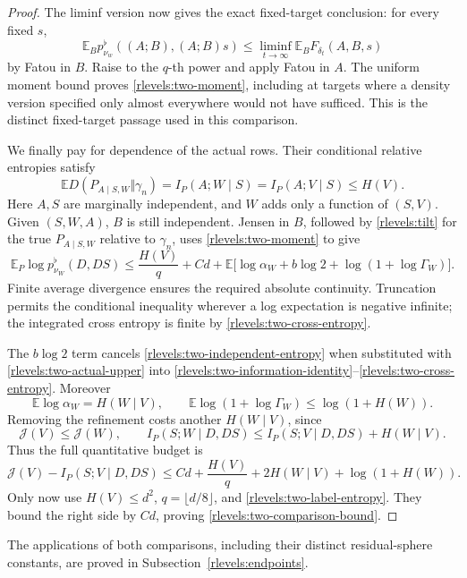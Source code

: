 \begin{proof}
The liminf version now gives the exact fixed-target conclusion:
for every fixed \(s\),
\[
 \mathbb E_Bp^\flat_{\nu_w}((A;B),(A;B)s)
 \le\liminf_{t\to\infty}\mathbb E_BF_{\delta_t}(A,B,s)
\]
by Fatou in \(B\).  Raise to the \(q\)-th power and apply Fatou
in \(A\).  The uniform moment bound proves
\eqref{rlevels:two-moment}, including at targets where a density
version specified only almost everywhere would not have sufficed.
This is the distinct fixed-target passage used in this comparison.

We finally pay for dependence of the actual rows.  Their conditional
relative entropies satisfy
\begin{equation}\label{rlevels:two-row-kl}
 \mathbb E D(P_{A\mid S,W}\Vert\gamma_n)
 =I_P(A;W\mid S)=I_P(A;V\mid S)\le H(V).
\end{equation}
Here \(A,S\) are marginally independent, and \(W\) adds only
a function of \((S,V)\).  Given \((S,W,A)\), \(B\) is still
independent.  Jensen in \(B\), followed by
\eqref{rlevels:tilt} for the true \(P_{A\mid S,W}\) relative to
\(\gamma_n\), uses \eqref{rlevels:two-moment} to give
\begin{equation}\label{rlevels:two-actual-upper}
 \mathbb E_P\log p^\flat_{\nu_W}(D,DS)
 \le \frac{H(V)}q+Cd+
 \mathbb E\bigl[\log\alpha_W+b\log2+
                    \log(1+\log\Gamma_W)\bigr].
\end{equation}
Finite average divergence ensures the required absolute continuity.
Truncation permits the conditional inequality wherever a log
expectation is negative infinite; the integrated cross entropy is
finite by \eqref{rlevels:two-cross-entropy}.

The \(b\log2\) term cancels
\eqref{rlevels:two-independent-entropy} when substituted with
\eqref{rlevels:two-actual-upper} into
\eqref{rlevels:two-information-identity}--\eqref{rlevels:two-cross-entropy}.
Moreover
\[
 \mathbb E\log\alpha_W=H(W\mid V),\qquad
 \mathbb E\log(1+\log\Gamma_W)\le\log(1+H(W)).
\]
Removing the refinement costs another \(H(W\mid V)\), since
\[
 \mathcal J(V)\le\mathcal J(W),\qquad
 I_P(S;W\mid D,DS)\le I_P(S;V\mid D,DS)+H(W\mid V).
\]
Thus the full quantitative budget is
\begin{equation}\label{rlevels:two-budget}
 \mathcal J(V)-I_P(S;V\mid D,DS)
 \le Cd+\frac{H(V)}q+2H(W\mid V)+\log(1+H(W)).
\end{equation}
Only now use \(H(V)\le d^2\), \(q=\lfloor d/8\rfloor\), and
\eqref{rlevels:two-label-entropy}.  They bound the right side by
\(Cd\), proving \eqref{rlevels:two-comparison-bound}.
\end{proof}


The applications of both comparisons, including their distinct residual-sphere constants, are proved in Subsection~\ref{rlevels:endpoints}.
